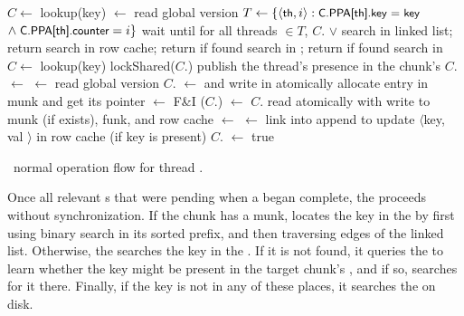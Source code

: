 \begin{algorithm}[tb]
\begin{algorithmic}[1]{}
		\State $C \leftarrow$ lookup(key)
		\State {} $\leftarrow$    \Comment read global version
		\State $T \leftarrow  \{ \langle \code{th}, i \rangle : \code{C.PPA[th].key = key }  $ 
		\Statex \hspace{21mm}	$ \wedge \; \code{C.PPA[th].counter} = i \}$ 
		\State wait until for all threads  $\in T$,  
		\Statex  \hspace{21mm}		$C.$ $\vee$ 
			\State search  in  linked list;  return 
		\EndIf
		\State search  in row cache; return  if found
		\Statex {}
			\State	search  in ; return  if found
		\EndIf
		\State	search  in 	
\EndProcedure
\Statex
{}	
		\State $C \leftarrow$ lookup(key)
		\State lockShared($C$.)
		\Statex \Comment publish the thread's presence in the chunk's 
		\State  $C$.  $\leftarrow$ 
		\State {} $\leftarrow$    \Comment read global version
		\State  $C$.  $\leftarrow$  \Comment and write in 
		\Statex \Comment atomically allocate entry in munk and get its pointer
		\State {} $\leftarrow$ F\&I ($C$.)
		\State {} $\leftarrow$ $C$. \Comment read atomically with 
		\Statex \Comment write  to munk (if exists), funk, and row cache  
			\State {}  $\leftarrow$ 
			\State {}  $\leftarrow$ 
			\State link  into   
		\EndIf
		\State append  to 
		\State update $\langle$key, val $\rangle$ in row cache (if key is present)
		\State $C$.  $\leftarrow$ true
\EndProcedure
\end{algorithmic}
\caption{\sys\ normal operation flow for thread .}
\label{alg:ops}
\end{algorithm}


Once all relevant s that were pending when a   began complete, the 
 proceeds without synchronization. If the chunk has a munk,     locates the key in the
  by first using binary search in its sorted prefix, and then traversing edges of the linked list. 
Otherwise, the  searches the key in the . If it is not found, it queries 
the  to learn whether the key might be present in the target chunk's  
 , and if so, searches for it there.  Finally, if the key is not in any of these places, it searches
 the   on disk.

